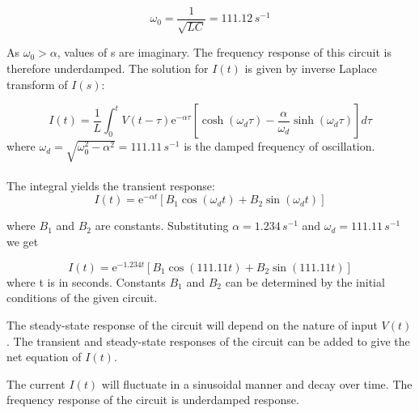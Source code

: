 \documentclass[journal,12pt,twocolumn]{IEEEtran}
\theoremstyle{remark}
\begin{document}
\begin{equation}
    \omega_0 = \dfrac{1}{\sqrt{LC}} = 111.12\, s^{-1}
\end{equation}

As $\omega_0>\alpha$, values of s are imaginary. The frequency response of this circuit is therefore underdamped. The solution for $I(t)$ is given by inverse Laplace transform of $I(s)$:

\begin{equation}
    I(t) = \dfrac{1}{L}\int_{0}^{t}V(t-\tau)\mathrm{e}^{-\alpha\tau}\left[\cosh(\omega_d \tau) - \dfrac{\alpha}{\omega_d}\sinh(\omega_d \tau)\right]d\tau
\end{equation}
where $\omega_d = \sqrt{\omega_0^2 - \alpha^2} = 111.11\, s^{-1}$ is the damped frequency of oscillation.\\
\\
The integral yields the transient response:
\begin{equation}
    I(t) = \mathrm{e}^{-\alpha t}\left[B_1\cos(\omega_d t) + B_2\sin(\omega_d t)\right]
\end{equation}
 
where $B_1$ and $B_2$ are constants. Substituting $\alpha = 1.234\, s^{-1}$ and $\omega_d = 111.11\, s^{-1}$ we get

\begin{equation}
    I(t) = \mathrm{e}^{-1.234t}\left[B_1\cos(111.11t) + B_2\sin(111.11t)\right]
\end{equation}
where t is in seconds.
Constants $B_1$ and $B_2$ can be determined by the initial conditions of the given circuit. 

The steady-state response of the circuit will depend on the nature of input $V(t)$. The transient and steady-state responses of the circuit can be added to give the net equation of $I(t)$.

The current $I(t)$ will fluctuate in a sinusoidal manner and decay over time. The frequency response of the circuit is underdamped response.



\renewcommand{\thefigure}{\theenumi}
\renewcommand{\thetable}{\theenumi}
\end{document}
